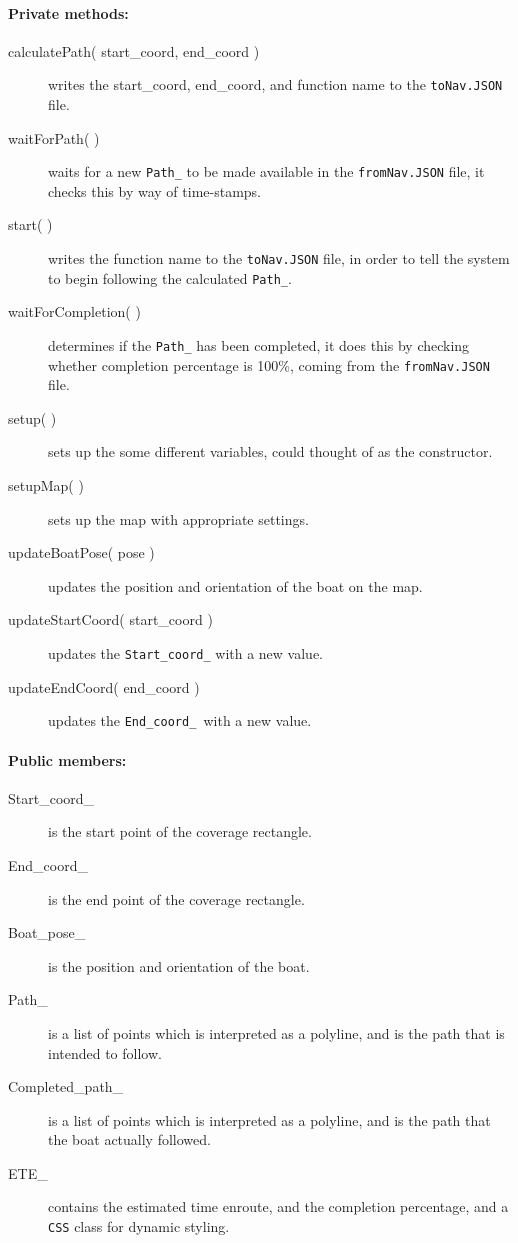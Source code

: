 \paragraph{Private methods:}
\begin{adjustwidth}{2.5em}{0pt}\begin{description}
		\item [calculatePath( start_coord, end_coord )] writes the start_coord, end_coord, and function name to the \texttt{toNav.JSON} file. 
		\item [waitForPath( )] waits for a new \texttt{Path_} to be made available in the \texttt{fromNav.JSON} file, it checks this by way of time-stamps.
		\item [start( )] writes the function name to the \texttt{toNav.JSON} file, in order to tell the system to begin following the calculated \texttt{Path_}.
		\item [waitForCompletion( )] determines if the \texttt{Path_} has been completed, it does this by checking whether completion percentage is 100\%, coming from the \texttt{fromNav.JSON} file.
		\item [setup( )] sets up the some different variables, could thought of as the constructor.
		\item [setupMap( )] sets up the map with appropriate settings.
		\item [updateBoatPose( pose )] updates the position and orientation of the boat on the map.
		\item [updateStartCoord( start_coord )] updates the \texttt{Start_coord_} with a new value.
		\item [updateEndCoord( end_coord )] updates the \texttt{End_coord_ }with a new value.
\end{description}\end{adjustwidth}

\paragraph{Public members:}
\begin{adjustwidth}{2.5em}{0pt}\begin{description}
		\item [Start_coord_] is the start point of the coverage rectangle.
		\item [End_coord_] is the end point of the coverage rectangle.
		\item [Boat_pose_] is the position and orientation of the boat.
		\item [Path_] is a list of points which is interpreted as a polyline, and is the path that is intended to follow.
		\item[Completed_path_] is a list of points which is interpreted as a polyline, and is the path that the boat actually followed.
		\item[ETE_] contains the estimated time enroute, and the completion percentage, and a \texttt{CSS} class for dynamic styling. 
\end{description}\end{adjustwidth}


